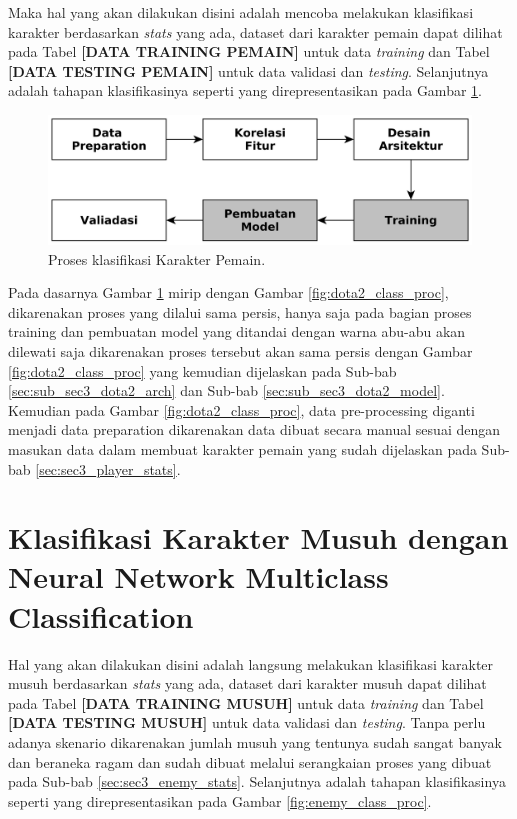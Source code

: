 Maka hal yang akan dilakukan disini adalah mencoba melakukan klasifikasi karakter berdasarkan \textit{stats} yang ada, dataset dari karakter pemain dapat dilihat pada Tabel \textbf{[DATA TRAINING PEMAIN]} untuk data \textit{training} dan Tabel \textbf{[DATA TESTING PEMAIN]} untuk data validasi dan \textit{testing}. Selanjutnya adalah tahapan klasifikasinya seperti yang direpresentasikan pada Gambar \ref{fig:char_class_proc}. 
\vspace{1ex}

\begin{figure} [!h] \centering
	\includegraphics[scale=0.032]{img/player_char_nn_classification.png}
	\caption{Proses klasifikasi Karakter Pemain.}
	\label{fig:char_class_proc}
\end{figure}

Pada dasarnya Gambar \ref{fig:char_class_proc} mirip dengan Gambar \ref{fig:dota2_class_proc}, dikarenakan proses yang dilalui sama persis, hanya saja pada bagian proses training dan pembuatan model yang ditandai dengan warna abu-abu akan dilewati saja dikarenakan proses tersebut akan sama persis dengan Gambar \ref{fig:dota2_class_proc} yang kemudian dijelaskan pada Sub-bab \ref{sec:sub_sec3_dota2_arch} dan Sub-bab \ref{sec:sub_sec3_dota2_model}. Kemudian pada Gambar \ref{fig:dota2_class_proc}, data pre-processing diganti menjadi data preparation dikarenakan data dibuat secara manual sesuai dengan masukan data dalam membuat karakter pemain yang sudah dijelaskan pada Sub-bab \ref{sec:sec3_player_stats}.
\vspace{1ex}

\section{Klasifikasi Karakter Musuh dengan Neural Network Multiclass Classification}
\label{sec:sec3_enemy_method}
\vspace{1ex}

Hal yang akan dilakukan disini adalah langsung melakukan klasifikasi karakter musuh berdasarkan \textit{stats} yang ada, dataset dari karakter musuh dapat dilihat pada Tabel \textbf{[DATA TRAINING MUSUH]} untuk data \textit{training} dan Tabel \textbf{[DATA TESTING MUSUH]} untuk data validasi dan \textit{testing}. Tanpa perlu adanya skenario dikarenakan jumlah musuh yang tentunya sudah sangat banyak dan beraneka ragam dan sudah dibuat melalui serangkaian proses yang dibuat pada Sub-bab \ref{sec:sec3_enemy_stats}. Selanjutnya adalah tahapan klasifikasinya seperti yang direpresentasikan pada Gambar \ref{fig:enemy_class_proc}. 
\vspace{1ex}

